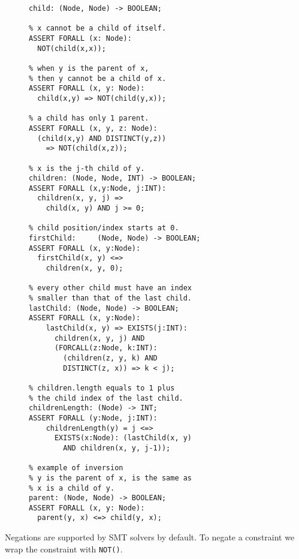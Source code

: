 \begin{figure}
\begin{lstlisting}[caption=SMT functions for defining the children.length DOM operation.  We start with defining the parent-child relationships; then move on to the ordering of children; then use the child index of the last child to define and quantify the {\tt childrenLength()} boolean function,label=childrenLength]  
% child(x, y): x is a child of y.
child: (Node, Node) -> BOOLEAN;	

% x cannot be a child of itself.
ASSERT FORALL (x: Node):	
  NOT(child(x,x));
	
% when y is the parent of x,
% then y cannot be a child of x.  
ASSERT FORALL (x, y: Node):
  child(x,y) => NOT(child(y,x));
  
% a child has only 1 parent.
ASSERT FORALL (x, y, z: Node):
  (child(x,y) AND DISTINCT(y,z)) 
    => NOT(child(x,z));

% x is the j-th child of y.
children: (Node, Node, INT) -> BOOLEAN;
ASSERT FORALL (x,y:Node, j:INT): 
  children(x, y, j) => 
    child(x, y) AND j >= 0;

% child position/index starts at 0.
firstChild:		(Node, Node) -> BOOLEAN;
ASSERT FORALL (x, y:Node):
  firstChild(x, y) <=> 
    children(x, y, 0);

% every other child must have an index 
% smaller than that of the last child.
lastChild: (Node, Node) -> BOOLEAN;	
ASSERT FORALL (x, y:Node): 	
	lastChild(x, y) => EXISTS(j:INT): 
	  children(x, y, j) AND 
	  (FORCALL(z:Node, k:INT): 
	    (children(z, y, k) AND 
	    DISTINCT(z, x)) => k < j);

% children.length equals to 1 plus
% the child index of the last child.
childrenLength:	(Node) -> INT;
ASSERT FORALL (y:Node, j:INT):
	childrenLength(y) = j <=> 
	  EXISTS(x:Node): (lastChild(x, y) 
	    AND children(x, y, j-1));

% example of inversion
% y is the parent of x, is the same as 
% x is a child of y.
parent: (Node, Node) -> BOOLEAN; 
ASSERT FORALL (x, y: Node): 
  parent(y, x) <=> child(y, x); 
\end{lstlisting} 
\end{figure}

Negations are supported by SMT solvers by default.  To negate a constraint we wrap the constraint with {\tt NOT()}.

